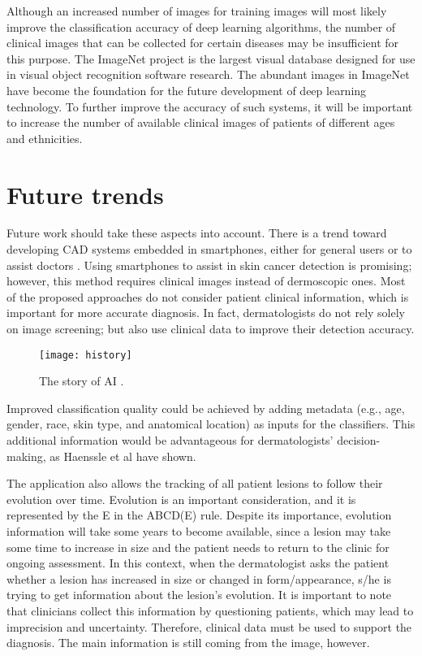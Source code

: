 Although an increased number of images for training images will most likely improve the classification accuracy of deep learning algorithms, the number of clinical images that can be collected for certain diseases may be insufficient for this purpose. The ImageNet project is the largest visual database designed for use in visual object recognition software research. The abundant images in ImageNet have become the foundation for the future development of deep learning technology. To further improve the accuracy of such systems, it will be important to increase the number of available clinical images of patients of different ages and ethnicities.

\section{Future trends}

Future work should take these aspects into account. There is a trend toward developing CAD systems embedded in smartphones, either for general users or to assist doctors \cite{chao2017smartphone,ngoo2018fighting}. Using smartphones to assist in skin cancer detection is promising; however, this method requires clinical images instead of dermoscopic ones\cite{pacheco2020impact}. Most of the proposed approaches do not consider patient clinical information, which is important for more accurate diagnosis. In fact, dermatologists do not rely solely on image screening; but also use clinical data to improve their detection accuracy.

\begin{figure}
\centerline{
 \texttt{[image: history]} 
 }
\caption{The story of AI \cite{bommasani2021opportunities}.}
\label{Fig:his}
\end{figure}

 Improved classification quality could be achieved by adding metadata (e.g., age, gender, race, skin type, and anatomical location) as inputs for the classifiers. This additional information would be advantageous for dermatologists' decision-making, as Haenssle et al \cite{haenssle2018man} have shown.

The application also allows the tracking of all patient lesions to follow their evolution
over time. Evolution is an important consideration, and it is represented by the E in the ABCD(E) rule. Despite its importance, evolution information will take some years to become available, since a lesion may take some time to increase in size and the patient needs to return to the clinic for ongoing assessment. In this context, when the dermatologist asks the patient whether a lesion has increased  in size or changed in form/appearance, s/he is trying to get information about the lesion’s evolution. It is important to note that clinicians collect this information by questioning patients, which may lead to imprecision and uncertainty. Therefore, clinical data must be used to support the diagnosis. The main information is still coming from the image, however.

